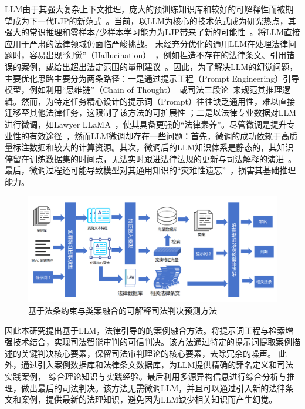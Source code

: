 LLM由于其强大复杂上下文推理，庞大的预训练知识库和较好的可解释性而被期望成为下一代LJP的新范式~\cite{wu2020de-biased,yang2023baichuan,yao2020refining}。当前，以LLM为核心的技术范式成为研究热点，其强大的常识推理和零样本/少样本学习能力为LJP带来了新的可能性~\cite{brown2020language,huang2022towards,shu2024large,wen2024review}。将LLM直接应用于严肃的法律领域仍面临严峻挑战。
未经充分优化的通用LLM在处理法律问题时，容易出现“幻觉”（Hallucination）~\cite{cui2023survey,radford2025improving,raffel2020exploring}，例如捏造不存在的法律条文、引用错误的案例，或给出超出法定范围的量刑建议~\cite{lewis2020retrieval}。因此，为了解决LLM的幻觉问题，主要优化思路主要分为两条路径：一是通过提示工程（Prompt Engineering）引导模型，例如利用“思维链”（Chain of Thought）~\cite{kojima2022large,izacard2021leveraging,rajani2019explain,talmor2019leap,wang2023self,wei2022chain}或司法三段论~\cite{huang2023lawyer,trautmann2022legal,xu2023superclue,yu2022legal}来规范其推理逻辑。然而，为特定任务精心设计的提示词（Prompt）往往缺乏通用性，难以直接迁移至其他法律任务，这限制了该方法的可扩展性
；二是以法律专业数据对LLM进行微调，如Lawyer LLaMA~\cite{chen2020recall,yue2021circumstances}，使其具备更强的“法律素养”。尽管微调是提升专业性的有效途径~\cite{hu2021lora,hu2022lora,zelikman2024star}，然而LLM微调却存在一些问题：首先，微调的成功依赖于高质量标注数据和较大的计算资源。其次，微调后的LLM知识体系是静态的，其知识停留在训练数据集的时间点，无法实时跟进法律法规的更新与司法解释的演进~\cite{li2021prefix,zhang2024comprehensive}。最后，微调过程还可能导致模型对其通用知识的“灾难性遗忘”~\cite{chen2020recall}，损害其基础推理能力。
\begin{figure}[htpb]
	\centering
	\includegraphics[width=1\textwidth]{fig/method.pdf}
	\caption{基于法条约束与类案融合的可解释司法判决预测方法}
	\label{fig:main}
\end{figure}
因此本研究提出基于LLM，法律引导的的案例融合方法。将提示词工程与检索增强技术结合，实现司法智能审判的可信判决。该方法通过特定的提示词提取案例描述的关键判决核心要素，保留司法审判理论的核心要素，去除冗余的噪声。 此外，通过引入案例数据库和法律条文数据库，为LLM提供精确的罪名定义和司法实践案例， 综合理论知识与实践经验。最后利用多源异构信息进行综合分析与推理，做出最后的司法判决。该方法无需微调LLM，并且可以通过引入新的法律条文和案例，提供最新的法理知识，避免因为LLM缺少相关知识而产生幻觉。
